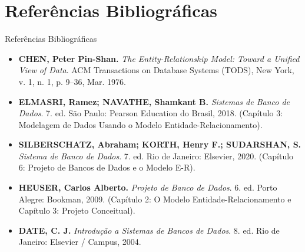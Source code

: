 \section{Referências Bibliográficas}

\begin{frame}{Referências Bibliográficas}
  \vspace{0.1cm}
  \begin{itemize}\setlength{\itemsep}{1.2mm}
    \footnotesize
    \item \textbf{CHEN, Peter Pin-Shan.} \textit{The Entity-Relationship Model: Toward a Unified View of Data}. ACM Transactions on Database Systems (TODS), New York, v. 1, n. 1, p. 9–36, Mar. 1976.
    
    \item \textbf{ELMASRI, Ramez; NAVATHE, Shamkant B.} \textit{Sistemas de Banco de Dados}. 7. ed. São Paulo: Pearson Education do Brasil, 2018. (Capítulo 3: Modelagem de Dados Usando o Modelo Entidade-Relacionamento).
    
    \item \textbf{SILBERSCHATZ, Abraham; KORTH, Henry F.; SUDARSHAN, S.} \textit{Sistema de Banco de Dados}. 7. ed. Rio de Janeiro: Elsevier, 2020. (Capítulo 6: Projeto de Bancos de Dados e o Modelo E-R).
    
    \item \textbf{HEUSER, Carlos Alberto.} \textit{Projeto de Banco de Dados}. 6. ed. Porto Alegre: Bookman, 2009. (Capítulo 2: O Modelo Entidade-Relacionamento e Capítulo 3: Projeto Conceitual).
    
    \item \textbf{DATE, C. J.} \textit{Introdução a Sistemas de Bancos de Dados}. 8. ed. Rio de Janeiro: Elsevier / Campus, 2004.
  \end{itemize}
\end{frame}
